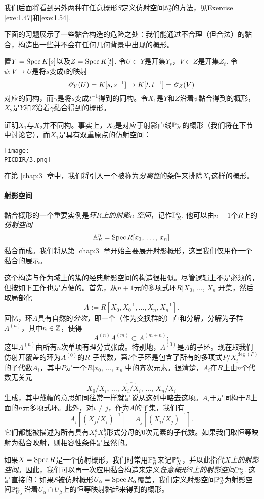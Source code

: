 我们后面将看到另外两种在任意概形$S$定义仿射空间$\mathbb{A}_S^n$的方法，见Exercise \ref{exe:1.47}和\ref{exe:1.54}.

下面的习题展示了一些黏合构造的危险之处：我们能通过不合理（但合法）的黏合，构造出一些并不会在任何几何背景中出现的概形。

\begin{exe}\label{exe:1.44}
置$Y=\spec K[s]$以及$Z=\spec K[t]$. 令$U\subset Y$是开集$Y_s$，$V\subset Z$是开集$Z_t$. 令$\psi:V\to U$是将$s$变成$t$的映射
\[
	\oo_Y(U)=K[s,s^{-1}]\to K[t,t^{-1}]=\oo_Z(V)
\]
对应的同构，而$\gamma$是将$s$变成$t^{-1}$得到的同构。令$X_1$是$Y$和$Z$沿着$\psi$黏合得到的概形，$X_2$是$Y$和$Z$沿着$\gamma$黏合得到的概形。

证明$X_1$与$X_2$并不同构。事实上，$X_2$是对应于射影直线$\P_K^1$的概形（我们将在下节中讨论它），而$X_1$是具有双重原点的仿射空间：

\begin{center}\texttt{[image: \\PICDIR/3.png]}\end{center}

在第 \ref{chap:3} 章中，我们将引入一个被称为\textit{分离性}的条件来排除$X_1$这样的概形。
\end{exe}

\paragraph*{射影空间}
黏合概形的一个重要实例是\textit{环$R$上的射影$n$-空间}，记作$\P^n_R$. 他可以由$n+1$个$R$上的\textit{仿射空间}
\[
	\A_R^n=\spec R[\text{$x_1$, $\dots$, $x_n$}]
\]
黏合而成。我们将从第 \ref{chap:3} 章开始主要展开射影概形，这里我们仅用作一个黏合的展示。

这个构造与作为域上的簇的经典射影空间的构造很相似。尽管逻辑上不是必须的，但按如下工作也是方便的。首先，从$n+1$元的多项式环$R[X_0$, $\dots$, $X_n]$开集，然后取局部化
\[
	A:=R[X_0,X_0^{-1},\dots,X_n,X_n^{-1}].
\]
回忆，环$A$具有自然的\textit{分次}，即一个（作为交换群的）直和分解，分解为子群$A^{(n)}$，其中$n\in \zz$，使得
\[
	A^{(n)}A^{(m)}\subset A^{(m+n)};
\]
这里$A^{(n)}$由所有$n$次单项有理分式张成。特别地，$A^{(0)}$是$A$的子环。现在取我们仿射开覆盖的环为$A^{(0)}$的$R$-子代数，第$i$个子环是包含了所有的多项式$P/X_i^{\deg(P)}$的子代数$A_i$，其中$P$是一个$R[x_0$, $\dots$, $x_n]$中的齐次元素。很清楚，$A_i$在$R$上由$n$个代数无关元
\[
	X_0/X_i,\,\dots,\,\widehat{X_i/X_i},\,\dots,\,X_n/X_i
\]
生成，其中戴帽的意思如同往常一样就是说从这列中略去这项。$A_i$于是同构于$R$上面的$n$元多项式环。此外，对$i\neq j$，作为$A$的子集，我们有
\[
	A_i[(X_j/X_i)^{-1}]=A_j[(X_i/X_j)^{-1}].
\]
它们都能被描述为所有具有$X_i^aX_j^b$形式分母的$0$次元素的子代数。如果我们取恒等映射为黏合映射，则相容性条件是显然的。

如果$X=\spec R$是一个仿射概形，我们时常用$\P^n_R$来记$\P^n_X$，并以此指代\textit{$X$上的射影空间}。因此，我们可以再一次应用黏合构造来定义\textit{任意概形$S$上的射影空间$\P_S^n$}. 这是直接的：如果$S$被仿射概形$U_\alpha=\spec R_\alpha$覆盖，我们定义射影空间$\P_S^n$为射影空间$\P_{U_\alpha}^n$沿着$U_\alpha\cap U_\beta$上的恒等映射黏起来得到的概形。
